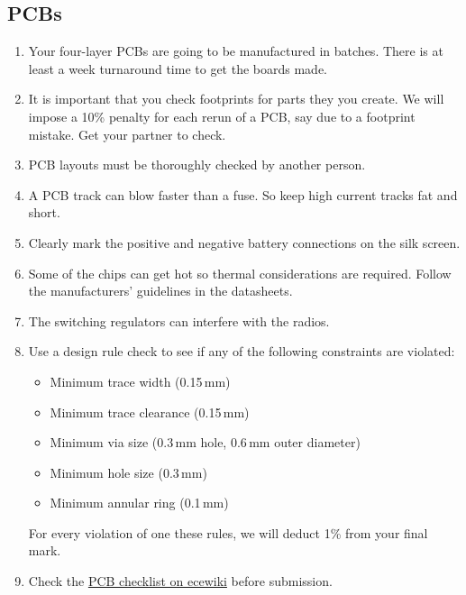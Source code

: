 \documentclass[11pt, a4paper]{article}
\begin{document}
\subsection{PCBs}

\begin{enumerate}
\item Your four-layer PCBs are going to be manufactured in batches.
  There is at least a week turnaround time to get the boards made.

\item It is important that you check footprints for parts they you
  create.  We will impose a 10\% penalty for each rerun of a PCB, say
  due to a footprint mistake.  Get your partner to check.
  
\item PCB layouts must be thoroughly checked by another person.
  
\item A PCB track can blow faster than a fuse. So keep high current
  tracks fat and short.

\item Clearly mark the positive and negative battery connections on
  the silk screen.

\item Some of the chips can get hot so thermal considerations are
  required.  Follow the manufacturers' guidelines in the datasheets.

\item The switching regulators can interfere with the radios.
  
\item Use a design rule check to see if any of the following
  constraints are violated:
%
\begin{itemize}
\item Minimum trace width (0.15\,mm)
\item Minimum trace clearance (0.15\,mm)
\item Minimum via size (0.3\,mm hole, 0.6\,mm outer diameter)
\item Minimum hole size (0.3\,mm)
\item Minimum annular ring (0.1\,mm)
\end{itemize}
%
For every violation of one these rules, we will deduct 1\% from your
final mark.

\item Check the
  \href{http://ecewiki.elec.canterbury.ac.nz/mediawiki/index.php/PCB_checklist}{PCB
    checklist on ecewiki} before submission.
\end{enumerate}
\end{document}
